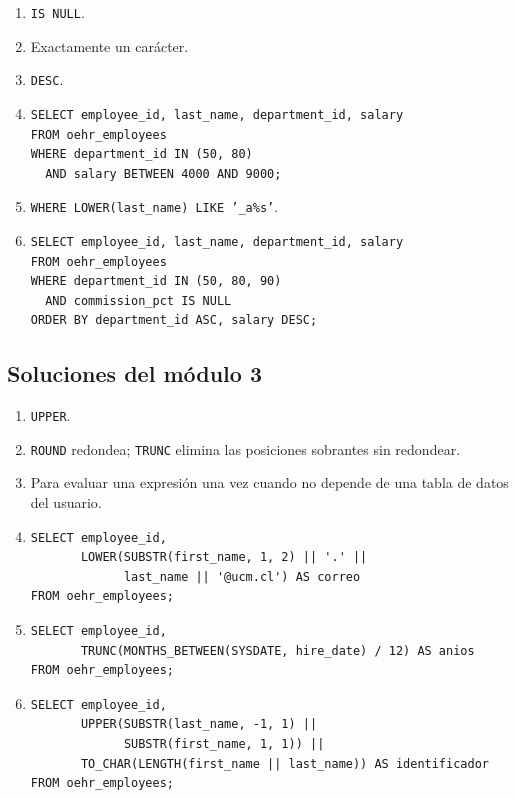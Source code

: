 \documentclass[11pt,a4paper]{article}
\newcommand{\campo}[1]{\texttt{#1}}
\begin{document}
\begin{enumerate}[label=\textbf{M2.\arabic*}]
  \item \campo{IS NULL}.
  \item Exactamente un carácter.
  \item \campo{DESC}.
  \item
\begin{lstlisting}
SELECT employee_id, last_name, department_id, salary
FROM oehr_employees
WHERE department_id IN (50, 80)
  AND salary BETWEEN 4000 AND 9000;
\end{lstlisting}
  \item \campo{WHERE LOWER(last\_name) LIKE '\_a\%s'}.
  \item
\begin{lstlisting}
SELECT employee_id, last_name, department_id, salary
FROM oehr_employees
WHERE department_id IN (50, 80, 90)
  AND commission_pct IS NULL
ORDER BY department_id ASC, salary DESC;
\end{lstlisting}
\end{enumerate}

\subsection{Soluciones del módulo 3}

\begin{enumerate}[label=\textbf{M3.\arabic*}]
  \item \campo{UPPER}.
  \item \campo{ROUND} redondea; \campo{TRUNC} elimina las posiciones sobrantes sin redondear.
  \item Para evaluar una expresión una vez cuando no depende de una tabla de datos del usuario.
  \item
\begin{lstlisting}
SELECT employee_id,
       LOWER(SUBSTR(first_name, 1, 2) || '.' ||
             last_name || '@ucm.cl') AS correo
FROM oehr_employees;
\end{lstlisting}
  \item
\begin{lstlisting}
SELECT employee_id,
       TRUNC(MONTHS_BETWEEN(SYSDATE, hire_date) / 12) AS anios
FROM oehr_employees;
\end{lstlisting}
  \item
\begin{lstlisting}
SELECT employee_id,
       UPPER(SUBSTR(last_name, -1, 1) ||
             SUBSTR(first_name, 1, 1)) ||
       TO_CHAR(LENGTH(first_name || last_name)) AS identificador
FROM oehr_employees;
\end{lstlisting}
\end{enumerate}
\end{document}
